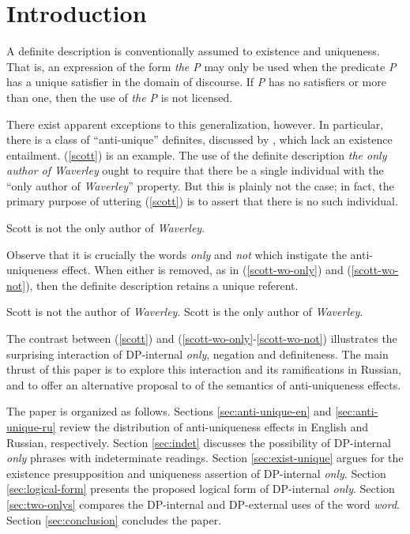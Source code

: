 \section{Introduction \label{sec:intro}}
A definite description is conventionally assumed to existence and uniqueness. That is, an expression of the form \textit{the P} may only be used when the predicate \textit{P} has a unique satisfier in the domain of discourse. If \textit{P} has no satisfiers or more than one, then the use of \textit{the P} is not licensed.

There exist apparent exceptions to this generalization, however. In particular, there is a class of ``anti-unique'' definites, discussed by \citet{cb2015}, which lack an existence entailment. (\ref{scott}) is an example. The use of the definite description \textit{the only author of Waverley} ought to require that there be a single individual with the ``only author of \textit{Waverley}'' property. But this is plainly not the case; in fact, the primary purpose of uttering (\ref{scott}) is to assert that there is no such individual.

\begin{exe}
	\ex \label{scott} Scott is not the only author of \textit{Waverley}.
\end{exe}

Observe that it is crucially the words \textit{only} and \textit{not} which instigate the anti-uniqueness effect. When either is removed, as in (\ref{scott-wo-only}) and (\ref{scott-wo-not}), then the definite description retains a unique referent.

\begin{exe}
	\ex \label{scott-wo-only} Scott is not the author of \textit{Waverley}.
	\ex \label{scott-wo-not} Scott is the only author of \textit{Waverley}.
\end{exe}

The contrast between (\ref{scott}) and (\ref{scott-wo-only}-\ref{scott-wo-not}) illustrates the surprising interaction of DP-internal \textit{only}, negation and definiteness. The main thrust of this paper is to explore this interaction and its ramifications in Russian, and to offer an alternative proposal to  of the semantics of anti-uniqueness effects.

The paper is organized as follows. Sections \ref{sec:anti-unique-en} and \ref{sec:anti-unique-ru} review the distribution of anti-uniqueness effects in English and Russian, respectively. Section \ref{sec:indet} discusses the possibility of DP-internal \textit{only} phrases with indeterminate readings. Section \ref{sec:exist-unique} argues for the existence presupposition and uniqueness assertion of DP-internal \textit{only}. Section \ref{sec:logical-form} presents the proposed logical form of DP-internal \textit{only}. Section \ref{sec:two-onlys} compares the DP-internal and DP-external uses of the word \textit{word}. Section \ref{sec:conclusion} concludes the paper.